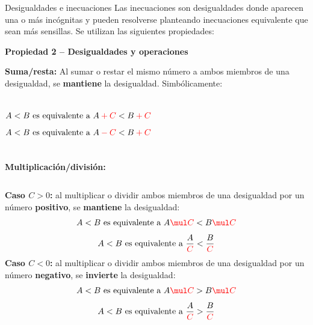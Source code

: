 \documentclass[9pt, aspectratio=169]{beamer}
\begin{document}
\begin{frame}{Desigualdades e inecuaciones}
Las inecuaciones son desigualdades donde aparecen una o más incógnitas y pueden resolverse planteando inecuaciones equivalente que sean más sensillas. Se utilizan las siguientes propiedades:

\textbf{Propiedad 2 -- Desigualdades y operaciones}

\textbf{Suma/resta:} Al sumar o restar el mismo número a ambos miembros de una desigualdad, se \textbf{mantiene} la desigualdad. Simbólicamente:
\begin{columns}
    \cx
    \[ A < B \text{ es equivalente a } A \mathcolor{red}{+C} < B  \mathcolor{red}{+C} \]
    \cx
    \[ A < B \text{ es equivalente a } A \mathcolor{red}{-C} < B  \mathcolor{red}{+C} \]
\end{columns} \medskip

\textbf{Multiplicación/división:} \medskip

\begin{columns}
\textbf{Caso $C>0$:} al multiplicar o dividir ambos miembros de una desigualdad por un número \textbf{positivo}, se \textbf{mantiene} la desigualdad:
\[ A < B \text{ es equivalente a } A \mathcolor{red}{\mul C} < B \mathcolor{red}{\mul C} \] 
\[ A < B \text{ es equivalente a } \frac{A} {\mathcolor{red}{C}} < \frac{B}{\mathcolor{red}{C}} \] 
\textbf{Caso $C<0$:} al multiplicar o dividir ambos miembros de una desigualdad por un número \textbf{negativo}, se \textbf{invierte} la desigualdad:
\[ A < B \text{ es equivalente a } A \mathcolor{red}{\mul C} > B \mathcolor{red}{\mul C} \] 
\[ A < B \text{ es equivalente a } \frac{A}{\mathcolor{red}{C}} > \frac{B}{\mathcolor{red}{C}} \] 
\end{columns}
\end{frame}
\end{document}
